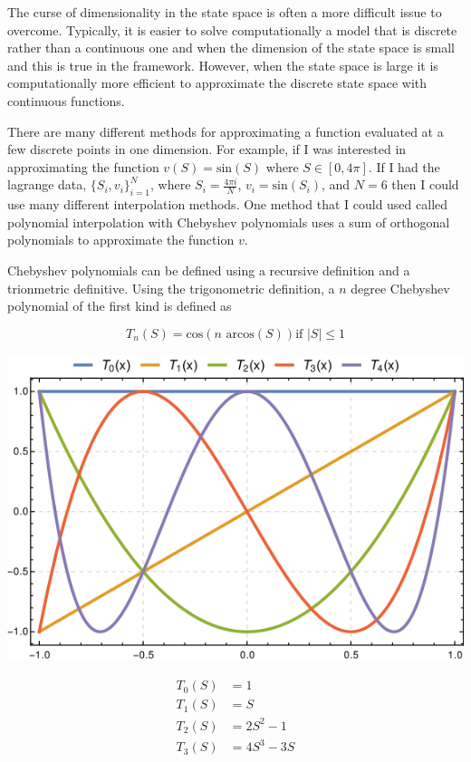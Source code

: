 \documentclass[12pt]{article}
\begin{document}
The curse of dimensionality in the state space is often a more difficult issue to overcome. Typically, it is easier to solve computationally a model that is discrete rather than a continuous one and when the dimension of the state space is small and this is true in the \citet{1995_Erickson_Pakes_RES} framework. However, when the state space is large it is computationally more efficient to approximate the discrete state space with continuous functions.

There are many different methods for approximating a function evaluated at a few discrete points in one dimension. For example, if I was interested in approximating the function $v(S)=\text{sin}(S)$ where $S \in [0, 4\pi]$. If I had the lagrange data, $\{S_i,v_i\}_{i=1}^N$, where $S_i=\frac{4\pi i}{N}$, $v_i=\text{sin}(S_i)$, and $N=6$ then I could use many different interpolation methods. One method that I could used called polynomial interpolation with Chebyshev polynomials uses a sum of orthogonal polynomials to approximate the function $v$.

Chebyshev polynomials can be defined using a recursive definition and a trionmetric definitive. Using the trigonometric definition, a $n$ degree Chebyshev polynomial of the first kind is defined as

\begin{equation*}
  T_n(S)=\text{cos}(n \text{ arcos}(S)) \text{if } |S| \leq 1
\end{equation*}

\includegraphics[scale=1.5]{plot_Chebyshev_Polynomials_of_the_First_Kind}

\begin{equation*}
  \begin{aligned}
    T_0(S)&=1\\
    T_1(S)&=S\\
    T_2(S)&=2S^2-1\\
    T_3(S)&=4S^3-3S
  \end{aligned}
\end{equation*}
\end{document}
